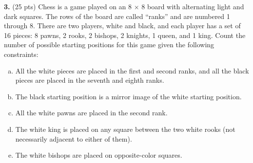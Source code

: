 \documentclass[11pt]{article}
\begin{document}
\newpage



\noindent \textbf{3.} (25 pts) Chess is a game played on an 8 $\times$ 8 board with alternating light and dark squares. The rows of the board are called ``ranks'' and are numbered 1 through 8. There are two players, white and black, and each player has a set of 16 pieces: 8 pawns, 2 rooks, 2 bishops, 2 knights, 1 queen, and 1 king. Count the number of possible starting positions for this game given the following constraints:

\begin{enumerate}[(a)]
	\item All the white pieces are placed in the first and second ranks, and all the black pieces
	are placed in the seventh and eighth ranks.

	
	\item The black starting position is a mirror image of the white starting position.

	\item All the white pawns are placed in the second rank.
	
	\item The white king is placed on any square between the two white rooks (not necessarily
	adjacent to either of them).
	
	\item The white bishops are placed on opposite-color squares.

\end{enumerate}
\end{document}
